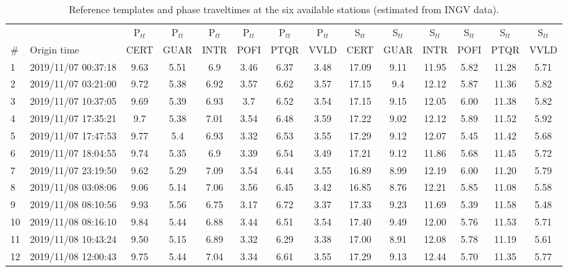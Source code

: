 \documentclass[a4paper,12pt]{article}
\begin{document}
\begin{landscape}

\begin{table}[!h]
\renewcommand{\thetable}{S\arabic{table}}
 \caption{Reference templates and phase traveltimes at the six available stations (estimated from INGV data).}
 \begin{center}
 \begin{tabular}{@{} l l c c c c c c c c c c c c}
    \hline
      & & P$_{tt}$ & P$_{tt}$ & P$_{tt}$ & P$_{tt}$ & P$_{tt}$ & P$_{tt}$ & S$_{tt}$ & S$_{tt}$ & S$_{tt}$ & S$_{tt}$ & S$_{tt}$ & S$_{tt}$   \\
      \# & Origin time     & CERT & GUAR & INTR & POFI & PTQR & VVLD & CERT & GUAR & INTR & POFI & PTQR & VVLD \\
    \hline
1 & 2019/11/07 00:37:18 & 9.63 & 5.51 & 6.9 & 3.46 & 6.37 & 3.48 & 17.09 & 9.11 & 11.95 & 5.82 & 11.28 & 5.71 \\
2 & 2019/11/07 03:21:00 & 9.72 & 5.38 & 6.92 & 3.57 & 6.62 & 3.57 & 17.15 & 9.4 & 12.12 & 5.87 & 11.36 & 5.82 \\
3 & 2019/11/07 10:37:05 & 9.69 & 5.39 & 6.93 & 3.7 & 6.52 & 3.54 & 17.15 & 9.15 & 12.05 & 6.00 & 11.38 & 5.82 \\
{4} & {2019/11/07 17:35:21} & {9.7} & {5.38} & {7.01} & {3.54} & {6.48} & {3.59} & {17.22} & {9.02} & {12.12} & {5.89} & {11.52} & {5.92} \\
5 & 2019/11/07 17:47:53 & 9.77 & 5.4 & 6.93 & 3.32 & 6.53 & 3.55 & 17.29 & 9.12 & 12.07 & 5.45 & 11.42 & 5.68 \\
6 & 2019/11/07 18:04:55 & 9.74 & 5.35 & 6.9 & 3.39 & 6.54 & 3.49 & 17.21 & 9.12 & 11.86 & 5.68 & 11.45 & 5.72 \\
7 & 2019/11/07 23:19:50 & 9.62 & 5.29 & 7.09 & 3.54 & 6.44 & 3.55 & 16.89 & 8.99 & 12.19 & 6.00 & 11.20 & 5.79 \\
8 & 2019/11/08 03:08:06 & 9.06 & 5.14 & 7.06 & 3.56 & 6.45 & 3.42 & 16.85 & 8.76 & 12.21 & 5.85 & 11.08 & 5.58 \\
9 & 2019/11/08 08:10:56 & 9.93 & 5.56 & 6.75 & 3.17 & 6.72 & 3.37 & 17.33 & 9.23 & 11.69 & 5.39 & 11.58 & 5.48 \\
10 & 2019/11/08 08:16:10 & 9.84 & 5.44 & 6.88 & 3.44 & 6.51 & 3.54 & 17.40 & 9.49 & 12.00 & 5.76 & 11.53 & 5.71 \\
11 & 2019/11/08 10:43:24 & 9.50 & 5.15 & 6.89 & 3.32 & 6.29 & 3.38 & 17.00 & 8.91 & 12.08 & 5.78 & 11.19 & 5.61 \\
12 & 2019/11/08 12:00:43 & 9.75 & 5.44 & 7.04 & 3.34 & 6.61 & 3.55 & 17.29 & 9.13 & 12.44 & 5.70 & 11.35 & 5.77 \\

\end{tabular}
\end{center}
\end{table}
\end{landscape}
\end{document}

